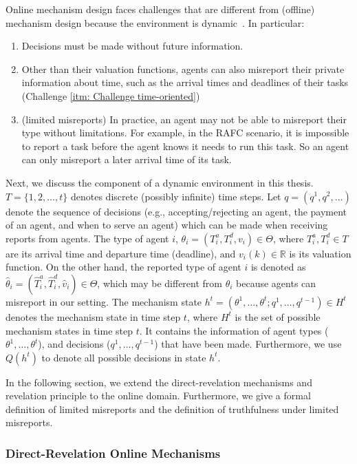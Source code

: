 \documentclass[11pt]{phdthesis}
\begin{document}
Online mechanism design faces challenges that are different from (offline) mechanism design because the environment is dynamic~\citep[Chapter 16]{nisan2007algorithmic}. In particular:
\begin{enumerate}
    \item Decisions must be made without future information.
    \item Other than their valuation functions, agents can also misreport their private information about time, such as the arrival times and deadlines of their tasks (Challenge \ref{itm: Challenge time-oriented})
    \item (limited misreports) In practice, an agent may not be able to misreport their type without limitations. For example, in the RAFC scenario, it is impossible to report a task before the agent knows it needs to run this task. So an agent can only misreport a later arrival time of its task.
\end{enumerate}

Next, we discuss the component of a dynamic environment in this thesis. $T = \{ 1,2,\ldots,t \}$ denotes discrete (possibly infinite) time steps. Let $q = (q^1,q^2,\ldots)$ denote the sequence of decisions (e.g., accepting/rejecting an agent, the payment of an agent, and when to serve an agent) which can be made when receiving reports from agents. The type of agent $ i $, $\theta_i = (T_i^a,T_i^d,v_i) \in \Theta$, where $T_i^a,T_i^d \in T$ are its arrival time and departure time (deadline), and $ v_i(k) \in \mathbb{R} $ is its valuation function. On the other hand, the reported type of agent $ i $ is denoted as $\hat{\theta}_i = (\hat{T}_i^a,\hat{T}_i^d,\hat{v}_i) \in \Theta$, which may be different from $ \theta_{i} $ because agents can misreport in our setting. The mechanism state $h^t = (\theta^1,\ldots, \theta^t; q^1,\ldots,q^{t-1}) \in H^t$ denotes the mechanism state in time step $ t $, where $ H^t $ is the set of possible mechanism states in time step $ t $. It contains the information of agent types ($\theta^1,\ldots, \theta^t$), and decisions ($q^1,\ldots,q^{t-1}$) that have been made. Furthermore, we use $ Q(h^t) $ to denote all possible decisions in state $ h^t $. ~\citep[Section 16.2]{nisan2007algorithmic}

In the following section, we extend the direct-revelation mechanisms and revelation principle to the online domain. Furthermore, we give a formal definition of limited misreports and the definition of truthfulness under limited misreports. 

\subsubsection{Direct-Revelation Online Mechanisms} \label{direct-revelation online mechanisms}
\end{document}
